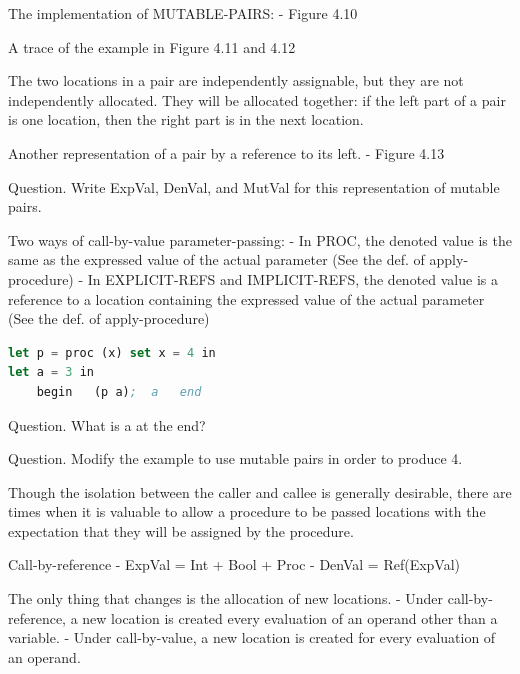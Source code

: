 \documentclass{article}
\begin{document}
\begin{huge}
The implementation of MUTABLE-PAIRS: \al
- Figure 4.10

A trace of the example in Figure 4.11 and 4.12 


The two locations in a pair are independently assignable, but they are not independently allocated. They will be allocated together: if the left part of a pair is one location, then the right part is in the next location.

Another representation of a pair by a reference to its left. \al
- Figure 4.13

Question. Write ExpVal, DenVal, and MutVal for this representation of mutable pairs.


Two ways of call-by-value parameter-passing:  \al
- In PROC, the denoted value is the same as the expressed value of the actual parameter (See the def. of apply-procedure) \al
- In EXPLICIT-REFS and IMPLICIT-REFS, the denoted value is a reference to a location containing the expressed value of the actual parameter (See the def. of apply-procedure)

\begin{lstlisting}[language=Lisp]
let p = proc (x) set x = 4 in
let a = 3 in
    begin   (p a);  a   end
\end{lstlisting}

Question. What is a at the end? 

Question. Modify the example to use mutable pairs in order to produce 4.


Though the isolation between the caller and callee is generally desirable, there are times when it is valuable to allow a procedure to be passed locations with the expectation that they will be assigned by the procedure.

Call-by-reference \al
- ExpVal = Int + Bool + Proc \al
- DenVal = Ref(ExpVal) 

The only thing that changes is the allocation of new locations. \al
- Under call-by-reference, a new location is created every evaluation of an operand other than a variable. \al
- Under call-by-value, a new location is created for every evaluation of an operand.


\end{huge}
\end{document}
